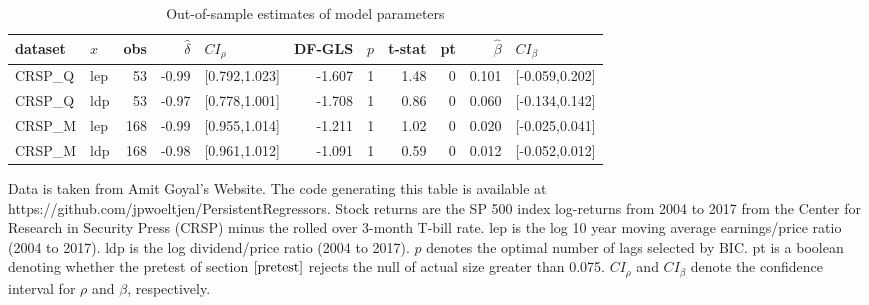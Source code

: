 \documentclass{article}
\begin{document}
\begin{table}[h!]
\small
\setlength\tabcolsep{5.3pt}
\centering
\caption{Out-of-sample estimates of model parameters}
\label{tab:oos}
\begin{threeparttable}
\begin{tabular}{llrrlrrrrrl}
  \hline
dataset & $x$ & obs & $\hat{\delta}$ & $CI_{\rho}$ & DF-GLS & $p$ &t-stat & pt & $\hat{\beta}$ & $CI_{\beta}$ \\ 
  \hline
  CRSP\_Q  & lep & 53 & -0.99 & [0.792,1.023] & -1.607 & 1 & 1.48 & 0 & 0.101 & [-0.059,0.202] \\ 
  CRSP\_Q & ldp & 53 & -0.97 & [0.778,1.001] & -1.708 & 1 & 0.86 & 0 & 0.060 & [-0.134,0.142] \\ 
  CRSP\_M & lep & 168 & -0.99 & [0.955,1.014] & -1.211 & 1 & 1.02 & 0 & 0.020 & [-0.025,0.041] \\ 
  CRSP\_M & ldp & 168 & -0.98 & [0.961,1.012] & -1.091 & 1 & 0.59 & 0 & 0.012 & [-0.052,0.012] \\ 
\hline
\end{tabular}
 \begin{tablenotes}
 \small
\item Data is taken from Amit Goyal’s Website. The code generating this table is available at https://github.com/jpwoeltjen/PersistentRegressors. Stock returns are the SP 500 index log-returns from 2004 to 2017 from the Center for Research in Security Press (CRSP) minus the rolled over 3-month T-bill rate. lep is the log 10 year moving average earnings/price ratio (2004 to 2017). ldp is the log dividend/price ratio (2004 to 2017).
$p$ denotes the optimal number of lags selected by BIC. pt is a boolean denoting whether the pretest of section $\ref{pretest}$ rejects the null of actual size greater than 0.075. $CI_{\rho}$ and $CI_{\beta}$ denote the confidence interval for $\rho$ and $\beta$, respectively.
\end{tablenotes}
\end{threeparttable}
\end{table}
\end{document}
